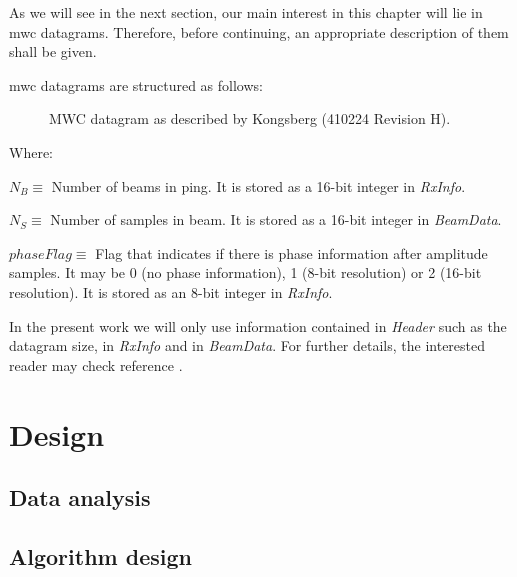 As we will see in the next section, our main interest in this chapter will lie in \acrshort{mwc} datagrams. Therefore, before continuing, an appropriate description of them shall be given.

\pagebreak
\acrshort{mwc} datagrams are structured as follows:

\begin{figure}[h!]
	\begin{center}
		\scalebox{.565}{}
	\end{center}
	\caption{MWC datagram as described by Kongsberg (410224 Revision H).}
	\label{fig:mwc_datagram}
\end{figure}
Where:
\begin{description}
	\item $N_B \equiv$ Number of beams in ping. It is stored as a 16-bit integer in \textit{RxInfo}.
	\item $N_S \equiv$ Number of samples in beam. It is stored as a 16-bit integer in \textit{BeamData}.
	\item $phaseFlag \equiv$ Flag that indicates if there is phase information after amplitude samples. It may be 0 (no phase information), 1 (8-bit resolution) or 2 (16-bit resolution). It is stored as an 8-bit integer in \textit{RxInfo}.
\end{description}

In the present work we will only use information contained in \textit{Header} such as the datagram size, in \textit{RxInfo} and in \textit{BeamData}. For further details, the interested reader may check reference \parencite{KMALL}.

\section{Design}

\subsection{Data analysis}
\subsection{Algorithm design}

